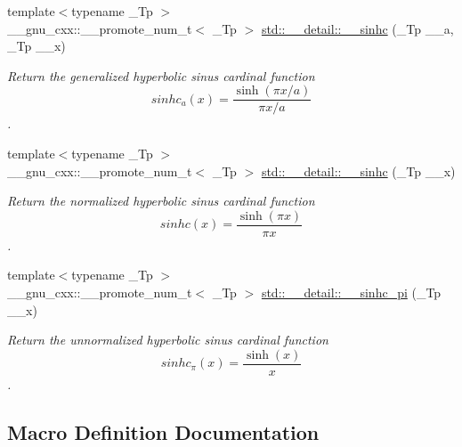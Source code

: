 \begin{DoxyCompactItemize}
{\footnotesize template$<$typename \+\_\+\+Tp $>$ }\\\+\_\+\+\_\+gnu\+\_\+cxx\+::\+\_\+\+\_\+promote\+\_\+num\+\_\+t$<$ \+\_\+\+Tp $>$ \hyperlink{namespacestd_1_1____detail_a04f920f7abd50780445c68fd5468d6b5}{std\+::\+\_\+\+\_\+detail\+::\+\_\+\+\_\+sinhc} (\+\_\+\+Tp \+\_\+\+\_\+a, \+\_\+\+Tp \+\_\+\+\_\+x)
\begin{DoxyCompactList}\small\item\em Return the generalized hyperbolic sinus cardinal function \[ sinhc_a(x) = \frac{\sinh(\pi x / a)}{\pi x / a} \]. \end{DoxyCompactList}\item 
{\footnotesize template$<$typename \+\_\+\+Tp $>$ }\\\+\_\+\+\_\+gnu\+\_\+cxx\+::\+\_\+\+\_\+promote\+\_\+num\+\_\+t$<$ \+\_\+\+Tp $>$ \hyperlink{namespacestd_1_1____detail_a355f2af77d2628ffdd4529dd24aea7a4}{std\+::\+\_\+\+\_\+detail\+::\+\_\+\+\_\+sinhc} (\+\_\+\+Tp \+\_\+\+\_\+x)
\begin{DoxyCompactList}\small\item\em Return the normalized hyperbolic sinus cardinal function \[ sinhc(x) = \frac{\sinh(\pi x)}{\pi x} \]. \end{DoxyCompactList}\item 
{\footnotesize template$<$typename \+\_\+\+Tp $>$ }\\\+\_\+\+\_\+gnu\+\_\+cxx\+::\+\_\+\+\_\+promote\+\_\+num\+\_\+t$<$ \+\_\+\+Tp $>$ \hyperlink{namespacestd_1_1____detail_a7e55ee1169f683db5530dc90c037c09f}{std\+::\+\_\+\+\_\+detail\+::\+\_\+\+\_\+sinhc\+\_\+pi} (\+\_\+\+Tp \+\_\+\+\_\+x)
\begin{DoxyCompactList}\small\item\em Return the unnormalized hyperbolic sinus cardinal function \[ sinhc_\pi(x) = \frac{\sinh(x)}{x} \]. \end{DoxyCompactList}\end{DoxyCompactItemize}


\subsection{Macro Definition Documentation}
